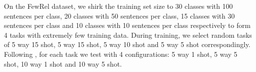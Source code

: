 On the FewRel dataset, we shirk the training set size to 30 classes with 100 sentences per class, 20 classes with 50 sentences per class, 15 classes with 30 sentences per class and 10 classes with 10 sentences per class respectively to form 4 tasks with extremely few training data. During training, we select random tasks of 5 way 15 shot, 5 way 15 shot, 5 way 10 shot and 5 way 5 shot correspondingly. Following \citet{han-etal-2018-fewrel, ye-ling-2019-multi}, for each task we test with 4 configurations: 5 way 1 shot, 5 way 5 shot, 10 way 1 shot and 10 way 5 shot.

